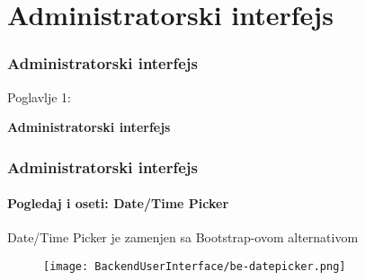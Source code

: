 %

\section{Administratorski interfejs}
\begin{frame}[fragile]
	\frametitle{Administratorski interfejs}

	\begin{center}\huge{Poglavlje  1:}\end{center}
	\begin{center}\huge{\color{typo3darkgrey}\textbf{Administratorski interfejs}}\end{center}

\end{frame}


\begin{frame}[fragile]
	\frametitle{Administratorski interfejs}
	\framesubtitle{Pogledaj i oseti: Date/Time Picker}

	Date/Time Picker je zamenjen sa Bootstrap-ovom alternativom
	\begin{figure}
		\texttt{[image: BackendUserInterface/be-datepicker.png]}
	\end{figure}

\end{frame}


